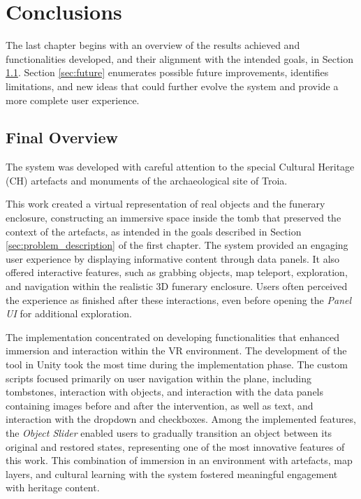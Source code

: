 
%

\chapter{Conclusions}
\label{cha:conclusions}
The last chapter begins with an overview of the results achieved and functionalities developed, and their alignment with the intended goals, in Section \ref{sec:final_overview}.
Section \ref{sec:future} enumerates possible future improvements, identifies limitations, and new ideas that could further evolve the system and provide a more complete user experience.
\section{Final Overview}
\label{sec:final_overview}
The system was developed with careful attention to the special Cultural Heritage (\gls{CH}) artefacts and monuments of the archaeological site of Troia. 

This work created a virtual representation of real objects and the funerary enclosure, constructing an immersive space inside the tomb that preserved the context of the artefacts, as intended in the goals described in Section \ref{sec:problem_description} of the first chapter.
The system provided an engaging user experience by displaying informative content through data panels. It also offered interactive features, such as grabbing objects, map teleport, exploration, and navigation within the realistic \gls{3D} funerary enclosure. Users often perceived the experience as finished after these interactions, even before opening the \emph{Panel \gls{UI}} for additional exploration. 

The implementation concentrated on developing functionalities that enhanced immersion and interaction within the \gls{VR} environment. 
The development of the tool in Unity took the most time during the implementation phase. The custom scripts focused primarily on user navigation within the plane, including tombstones, interaction with objects, and interaction with the data panels containing images before and after the intervention, as well as text, and interaction with the dropdown and checkboxes. 
Among the implemented features, the \emph{Object Slider} enabled users to gradually transition an object between its original and restored states, representing one of the most innovative features of this work.
This combination of immersion in an environment with artefacts, map layers, and cultural learning with the system fostered meaningful engagement with heritage content.

